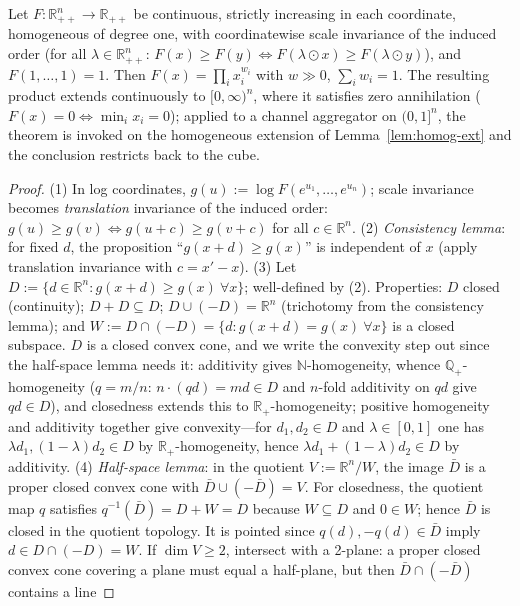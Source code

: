 \begin{theorem}
\label{thm:routeb}
Let $F:\mathbb{R}_{++}^n\to\mathbb{R}_{++}$ be continuous, strictly increasing
in each coordinate, homogeneous of degree one, with coordinatewise scale
invariance of the induced order (for all $\lambda\in\mathbb{R}_{++}^n$:
$F(x)\ge F(y)\iff F(\lambda\odot x)\ge F(\lambda\odot y)$), and $F(1,\dots,1)=1$.
Then $F(x)=\prod_ix_i^{w_i}$ with $w\gg0$, $\sum_iw_i=1$. The resulting
product extends continuously to $[0,\infty)^n$, where it satisfies zero
annihilation ($F(x)=0\iff\min_ix_i=0$); applied to a channel aggregator on
$(0,1]^n$, the theorem is invoked on the homogeneous extension of
Lemma~\ref{lem:homog-ext} and the conclusion restricts back to the cube.
\end{theorem}
\begin{proof}
(1) In log coordinates, $g(u):=\log F(e^{u_1},\dots,e^{u_n})$; scale
invariance becomes \emph{translation} invariance of the induced order:
$g(u)\ge g(v)\iff g(u+c)\ge g(v+c)$ for all $c\in\mathbb{R}^n$.
(2) \emph{Consistency lemma}: for fixed $d$, the proposition
``$g(x+d)\ge g(x)$'' is independent of $x$ (apply translation invariance with
$c=x'-x$).
(3) Let $D:=\{d\in\mathbb{R}^n: g(x+d)\ge g(x)\ \forall x\}$; well-defined by
(2). Properties: $D$ closed (continuity); $D+D\subseteq D$;
$D\cup(-D)=\mathbb{R}^n$ (trichotomy from the consistency lemma); and
$W:=D\cap(-D)=\{d:g(x+d)=g(x)\ \forall x\}$ is a closed subspace. $D$ is a
closed convex cone, and we write the convexity step out since the half-space
lemma needs it: additivity gives $\mathbb{N}$-homogeneity, whence
$\mathbb{Q}_+$-homogeneity ($q=m/n$: $n\cdot(qd)=md\in D$ and $n$-fold
additivity on $qd$ give $qd\in D$), and closedness extends this to
$\mathbb{R}_+$-homogeneity; positive homogeneity and additivity together give
convexity---for $d_1,d_2\in D$ and $\lambda\in[0,1]$ one has
$\lambda d_1,(1-\lambda)d_2\in D$ by $\mathbb{R}_+$-homogeneity, hence
$\lambda d_1+(1-\lambda)d_2\in D$ by additivity.
(4) \emph{Half-space lemma}: in the quotient $V:=\mathbb{R}^n/W$, the image
$\bar D$ is a proper closed convex cone with $\bar D\cup(-\bar D)=V$. For
closedness, the quotient map $q$ satisfies $q^{-1}(\bar D)=D+W=D$ because
$W\subseteq D$ and $0\in W$; hence $\bar D$ is closed in the quotient
topology. It is pointed since $q(d),-q(d)\in\bar D$ imply $d\in D\cap(-D)=W$.
If
$\dim V\ge2$, intersect with a 2-plane: a proper closed convex cone covering a
plane must equal a half-plane, but then $\bar D\cap(-\bar D)$ contains a line

\end{proof}
